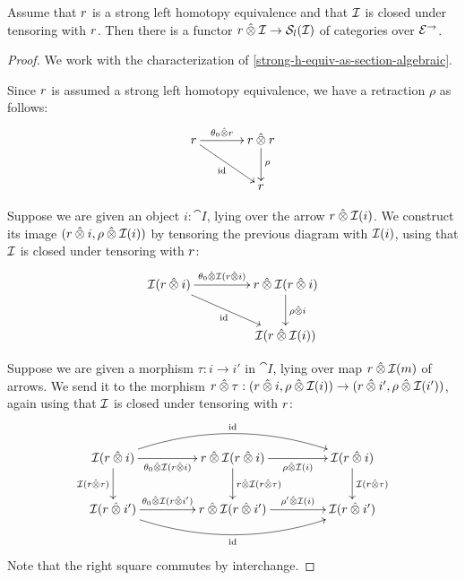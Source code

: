 \documentclass[reqno,10pt,a4paper,oneside]{amsart}
\begin{document}
\begin{lemma}
\label{horn-times-gen-to-she}
Assume that $\intervalr$ is a strong left homotopy equivalence and that $\cal{I}$ is closed under tensoring with $\intervalr$.
Then there is a functor $\intervalr \hatotimes \cal{I} \to \cal{S}_l(\cal{I})$ of categories over $\catE^{\to}$.
\end{lemma}

\begin{proof}
We work with the characterization of \cref{strong-h-equiv-as-section-algebraic}.

Since $\intervalr$ is assumed a strong left homotopy equivalence, we have a retraction $\rho$ as follows:
\[
\xymatrix@C+1em{
  \intervalr
  \ar[r]^-{\thetal \hatotimes \intervalr}
  \ar[dr]_{\id}
&
  \intervalr \hatotimes \intervalr \ar[d]^{\rho}
\\&
  \intervalr
}
\]

Suppose we are given an object $i : \cat{I}$, lying over the arrow $\intervalr \hatotimes \cal{I}(i)$.
We construct its image $(\intervalr \hatotimes i, \rho \hatotimes \cal{I}(i))$ by tensoring the previous diagram with $\cal{I}(i)$, using that $\cal{I}$ is closed under tensoring with $\intervalr$:
\[
\xymatrix@C+2em{
  \cal{I}(\intervalr \hatotimes i)
  \ar[r]^-{\thetal \hatotimes \cal{I}(\intervalr \hatotimes i)}
  \ar[dr]_{\id}
&
  \intervalr \hatotimes \cal{I}(\intervalr \hatotimes i \ar[d]^{\rho \hatotimes i})
\\&
  \cal{I}(\intervalr \hatotimes \cal{I}(i))
}
\]

Suppose we are given a morphism $\tau : i \to i'$ in $\cat{I}$, lying over map $\intervalr \hatotimes \cal{I}(m)$ of arrows.
We send it to the morphism $\intervalr \hatotimes \tau : (\intervalr \hatotimes i, \rho \hatotimes \cal{I}(i)) \to (\intervalr \hatotimes i', \rho \hatotimes \cal{I}(i'))$, again using that $\cal{I}$ is closed under tensoring with $\intervalr$: 
\[
\xymatrix@C+2em{
  \cal{I}(\intervalr \hatotimes i)
  \ar[r]_-{\thetal \hatotimes \cal{I}(\intervalr \hatotimes i)}
  \ar[d]_{\cal{I}(\intervalr \hatotimes \tau)}
  \ar@/^2em/[rr]^{\id}
&
  \intervalr \hatotimes \cal{I}(\intervalr \hatotimes i)
  \ar[r]_-{\rho \hatotimes \cal{I}(i)}
  \ar[d]^{\intervalr \hatotimes \cal{I}(\intervalr \hatotimes \tau)}
&
  \cal{I}(\intervalr \hatotimes i)
  \ar[d]^{\cal{I}(\intervalr \hatotimes \tau)}
\\
  \cal{I}(\intervalr \hatotimes i')
  \ar[r]^-{\thetal \hatotimes \cal{I}(\intervalr \hatotimes i')}
  \ar@/_2em/[rr]_{\id}
&
  \intervalr \hatotimes \cal{I}(\intervalr \hatotimes i')
  \ar[r]^-{\rho' \hatotimes \cal{I}(i)}
&
  \cal{I}(\intervalr \hatotimes i')
}
\]
Note that the right square commutes by interchange.
\end{proof}
\end{document}
